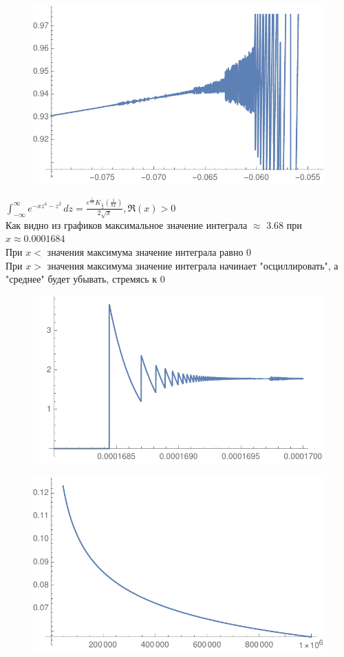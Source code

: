 \documentclass[10pt,a4paper]{article}
\begin{document}
\begin{figure}[!h]
\includegraphics{gr3}
\end{figure}

$\int_{-\infty }^{\infty } e^{-x z^4-z^2} \, dz = \frac{e^{\frac{1}{8 x}} K_{\frac{1}{4}}\left(\frac{1}{8 x}\right)}{2 \sqrt{x}},\Re(x)>0$\\

Как видно из графиков максимальное значение интеграла $\approx$ 3.68 при $x\approx 0.0001684$\\
При $x<$ значения максимума значение интеграла равно 0\\
При $x>$ значения максимума значение интеграла начинает "осциллировать", а "среднее" будет убывать, стремясь к 0

\begin{figure}[h]
\includegraphics{gr4}
\end{figure}

\begin{figure}[h]
\includegraphics{gr5}
\end{figure}
\end{document}
